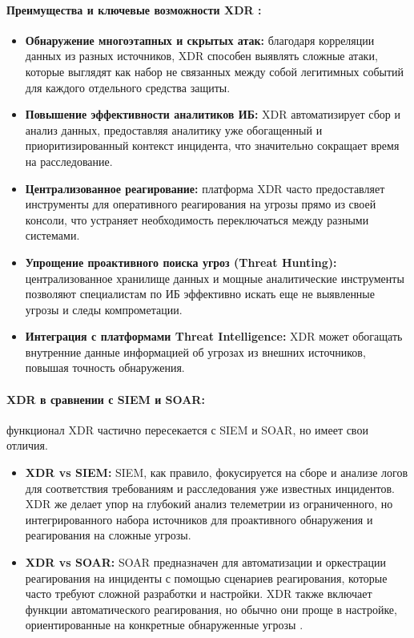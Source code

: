 \paragraph*{Преимущества и ключевые возможности XDR \cite{PositiveTechnologiesXDR}:}
\begin{itemize}
    \item \textbf{Обнаружение многоэтапных и скрытых атак:} благодаря корреляции данных из разных источников, XDR способен выявлять сложные атаки, которые выглядят как набор не связанных между собой легитимных событий для каждого отдельного средства защиты.
    \item \textbf{Повышение эффективности аналитиков ИБ:} XDR автоматизирует сбор и анализ данных, предоставляя аналитику уже обогащенный и приоритизированный контекст инцидента, что значительно сокращает время на расследование.
    \item \textbf{Централизованное реагирование:} платформа XDR часто предоставляет инструменты для оперативного реагирования на угрозы прямо из своей консоли, что устраняет необходимость переключаться между разными системами.
    \item \textbf{Упрощение проактивного поиска угроз (Threat Hunting):} централизованное хранилище данных и мощные аналитические инструменты позволяют специалистам по ИБ эффективно искать еще не выявленные угрозы и следы компрометации.
    \item \textbf{Интеграция с платформами Threat Intelligence:} XDR может обогащать внутренние данные информацией об угрозах из внешних источников, повышая точность обнаружения.
\end{itemize}

\paragraph*{XDR в сравнении с SIEM и SOAR:} функционал XDR частично пересекается с SIEM и SOAR, но имеет свои отличия.
\begin{itemize}
    \item \textbf{XDR vs SIEM:} SIEM, как правило, фокусируется на сборе и анализе логов для соответствия требованиям и расследования уже известных инцидентов. XDR же делает упор на глубокий анализ телеметрии из ограниченного, но интегрированного набора источников для проактивного обнаружения и реагирования на сложные угрозы.
    \item \textbf{XDR vs SOAR:} SOAR предназначен для автоматизации и оркестрации реагирования на инциденты с помощью сценариев реагирования, которые часто требуют сложной разработки и настройки. XDR также включает функции автоматического реагирования, но обычно они проще в настройке, ориентированные на конкретные обнаруженные угрозы \cite{KasperskyXDR}.
\end{itemize}

